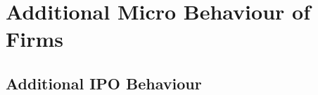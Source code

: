 \documentclass[12pt,notitlepage]{article}
\begin{document}

\FloatBarrier
\section{Additional Micro Behaviour of Firms} %
\label{sec:additional_micro_behaviour_of_firms}
\FloatBarrier


\subsection{Additional IPO Behaviour} %
\label{sec:additional_ipo_behaviour}

\begin{table}[!htpb]
\caption{Number of data points x years after an IPO (cumulative)}
    \begin{center}
    \end{center}
\end{table}
\end{document}
